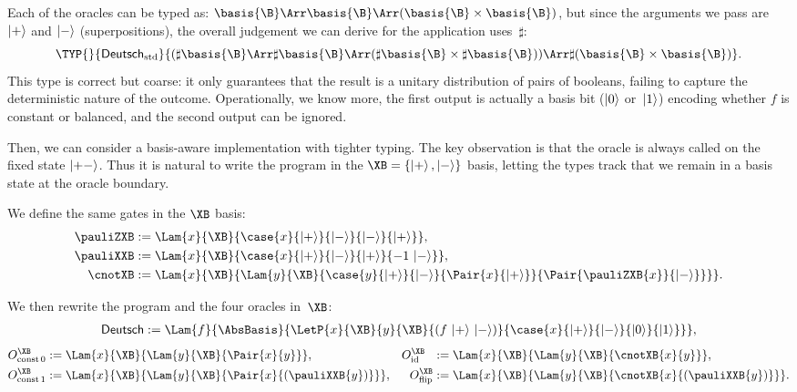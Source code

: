 Each of the oracles can be typed as:
\(
  \basis{\B}\Arr\basis{\B}\Arr(\basis{\B}\times\basis{\B})
\),
but since the arguments we pass are $\left\vert{+}\right\rangle$ and $\left\vert{-}\right\rangle$ (superpositions),
the overall judgement we can derive for the application uses~$\sharp$:
\[
  \TYP{}{\mathsf{Deutsch}_{\mathrm{std}}}
  {(\sharp\basis{\B}\Arr\sharp\basis{\B}\Arr(\sharp\basis{\B}\times\sharp\basis{\B}))
   \Arr \sharp(\basis{\B}\times\basis{\B})}.
\]
This type is correct but coarse: it only guarantees that the result is a
unitary distribution of pairs of booleans, failing to capture the deterministic
nature of the outcome. Operationally, we know more, the
first output is actually a basis bit ($\left\vert{0}\right\rangle$ or~$\left\vert{1}\right\rangle$) encoding whether
$f$ is constant or balanced, and the second output can be ignored.

Then, we can consider a basis-aware implementation with tighter typing.
The key observation is that the oracle is always called on the fixed state
$\left\vert{+-}\right\rangle$.  
Thus it is natural to write the program in the
$\XB=\{\ket{+},\ket{-}\}$ basis, letting the types track that we remain in a
basis state at the oracle boundary.

We define the same gates in the $\XB$ basis:
\begin{align*}
  \pauliZXB &:= \Lam{x}{\XB}{\case{x}{\ket{+}}{\ket{-}}{\ket{-}}{\ket{+}}},\\
  \pauliXXB &:= \Lam{x}{\XB}{\case{x}{\ket{+}}{\ket{-}}{\ket{+}}{-1\,\ket{-}}},\\
  \cnotXB &:= \Lam{x}{\XB}{\Lam{y}{\XB}{
    \case{y}{\ket{+}}{\ket{-}}
      {\Pair{x}{\ket{+}}}
      {\Pair{\pauliZXB{x}}{\ket{-}}}
  }}.
\end{align*}

We then rewrite the program and the four oracles in~$\XB$:
\begin{align*}
  \mathsf{Deutsch} &:= \Lam{f}{\AbsBasis}{ \LetP{x}{\XB}{y}{\XB}{(f\,\ket{+}\,\ket{-})} {\case{x}{\ket{+}}{\ket{-}}{\ket{0}}{\ket{1}}}},\\
\end{align*}
\vspace{-2\baselineskip}
\begin{align*}
  O_{\mathrm{const}\,0}^{\XB} &:= \Lam{x}{\XB}{\Lam{y}{\XB}{\Pair{x}{y}}},
  &O_{\mathrm{id}}^{\XB}\ \ &:= \Lam{x}{\XB}{\Lam{y}{\XB}{\cnotXB{x}{y}}},\\
  O_{\mathrm{const}\,1}^{\XB} &:= \Lam{x}{\XB}{\Lam{y}{\XB}{\Pair{x}{(\pauliXXB{y})}}},
  &O_{\mathrm{flip}}^{\XB} &:= \Lam{x}{\XB}{\Lam{y}{\XB}{\cnotXB{x}{(\pauliXXB{y})}}}.
\end{align*}


